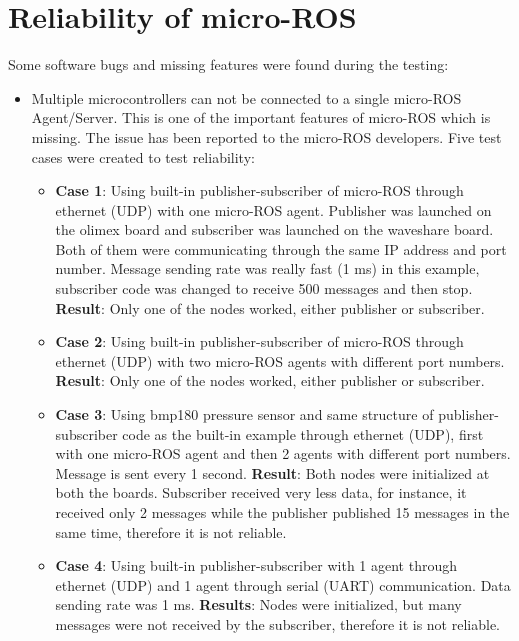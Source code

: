 \documentclass[%
xelatex,
	oneside,		%
	12pt,			%
	parskip=half,	%
	abstracton,
	chapterprefix=true%
    appendixprefix=true]
{scrbook}
\begin{document}
		\section{Reliability of micro-ROS}
		\vspace*{0.5cm}
		Some software bugs and missing features were found during the testing:
	\begin{itemize}	
	\item Multiple microcontrollers can not be connected to a single micro-ROS Agent/Server. This is one of the important features of micro-ROS which is missing. The issue has been reported to the micro-ROS developers. Five test cases were created to test reliability:
\begin{itemize}
\item {\bfseries Case 1}: Using built-in publisher-subscriber of micro-ROS through ethernet (UDP) with one micro-ROS agent. 
Publisher was launched on the olimex board and subscriber was launched on the waveshare board. Both of them were communicating through the same IP address and port number. Message sending rate was really fast (1 ms) in this example, subscriber code was changed to receive 500 messages and then stop. \linebreak
{\bfseries Result}: Only one of the nodes worked, either publisher or subscriber.

\item {\bfseries Case 2}: Using built-in publisher-subscriber of micro-ROS through ethernet (UDP) with two micro-ROS agents with different port numbers.\linebreak
{\bfseries Result}: Only one of the nodes worked, either publisher or subscriber.

\item {\bfseries Case 3}: Using bmp180 pressure sensor and same structure of publisher-subscriber code as the built-in example through ethernet (UDP), first with one micro-ROS agent and then 2 agents with different port numbers.
Message is sent every 1 second.\linebreak
{\bfseries Result}: Both nodes were initialized at both the boards. Subscriber received very less data, for instance, it received only 2 messages while the publisher published 15 messages in the same time, therefore it is not reliable.

\item {\bfseries Case 4}: Using built-in publisher-subscriber with 1 agent through ethernet (UDP) and 1 agent through serial (UART) communication.
Data sending rate was 1 ms.\linebreak
{\bfseries Results}: Nodes were initialized, but many messages were not received by the subscriber, therefore it is not reliable.


\end{itemize}
\end{itemize}
\end{document}
